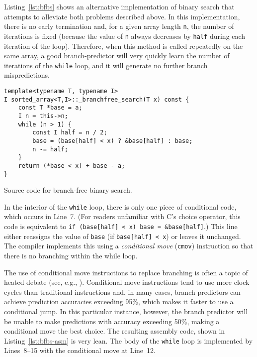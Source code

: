 \documentclass{patmorin}
\newcommand{\lstlabel}[1]{\label{lst:#1}}
\newcommand{\lstref}[1]{Listing~\ref{lst:#1}}
\newcommand{\Lstref}[1]{\lstref{#1}}
\begin{document}
\Lstref{bfbs} shows an alternative implementation of binary search
that attempts to alleviate both problems described above.  In this
implementation, there is no early termination and, for a given array
length \texttt{n}, the number of iterations is fixed (because the
value of \texttt{n} always decreases by \texttt{half}
during each iteration of the loop).  Therefore, when this method is
called repeatedly on the same array, a good branch-predictor will very
quickly learn the number of iterations of the \texttt{while}
loop, and it will generate no further branch mispredictions.

\begin{listing}
\begin{verbatim}
template<typename T, typename I>
I sorted_array<T,I>::_branchfree_search(T x) const {
    const T *base = a;
    I n = this->n;
    while (n > 1) {
        const I half = n / 2;
        base = (base[half] < x) ? &base[half] : base;
        n -= half;
    }
    return (*base < x) + base - a;
}
\end{verbatim}
\caption{Source code for branch-free binary search.}
\lstlabel{bfbs}
\end{listing}

In the interior of the \texttt{while} loop, there is only
one piece of conditional code, which occurs in Line~7.  (For readers
unfamiliar with C's choice operator, this code is equivalent
to \texttt{if (base[half] < x) base = &base[half]}.)
This line either reassigns the value of \texttt{base} (if
\texttt{base[half] < x}) or leaves it unchanged.  The compiler
implements this using a \emph{conditional move} (\texttt{cmov})
instruction so that there is no branching within the while loop.

The use of conditional move instructions to replace branching is
often a topic of heated debate (see, e.g., \cite{X}).  Conditional move
instructions tend to use more clock cycles than traditional instructions
and, in many cases, branch predictors can achieve prediction accuracies
exceeding 95\%, which makes it faster to use a conditional jump.  In this
particular instance, however, the branch predictor will be unable to make
predictions with accuracy exceeding 50\%, making a conditional move the
best choice.  The resulting assembly code, shown in \lstref{bfbs-asm} is
very lean.  The body of the \texttt{while} loop is implemented
by Lines~8--15 with the conditional move at Line~12.
\end{document}
